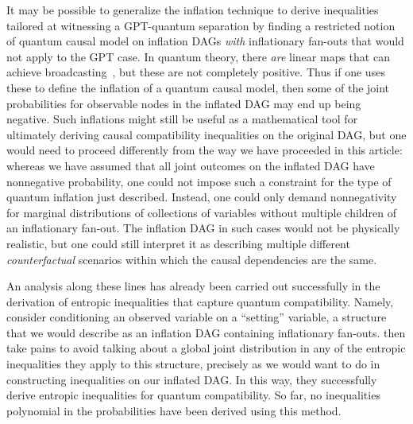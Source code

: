 {It may be possible to generalize the inflation technique to derive inequalities tailored at witnessing a GPT-quantum separation by finding a restricted notion of quantum causal model on inflation DAGs \emph{with} inflationary fan-outs that would not apply to the GPT case.
In quantum theory, there {\em are} linear maps that can achieve broadcasting~\cite{Coecke2011}, but these are not completely positive. Thus if one uses these to define the inflation of a quantum causal model, then some of the joint probabilities for observable nodes in the inflated DAG may end up being negative.  Such inflations might still be useful as a mathematical tool for ultimately deriving causal compatibility inequalities on the original DAG, but one would need to proceed differently from the way we have proceeded in this article: whereas we have assumed that all joint outcomes on the inflated DAG have nonnegative probability, one could not impose such a constraint for the type of quantum inflation just described.  Instead, one could only demand nonnegativity for marginal distributions of collections of variables without multiple children of an inflationary fan-out.  The inflation DAG in such cases would not be physically realistic, but one could still interpret it as describing multiple different {\em counterfactual} scenarios within which the causal dependencies are the same.

An analysis along these lines has already been carried out successfully in the derivation of entropic inequalities that capture quantum compatibility. Namely, \citet{Chaves2015infoquantum} consider conditioning an observed variable on a ``setting'' variable, a structure that we would describe as an inflation DAG containing inflationary fan-outs. \citet{Chaves2015infoquantum} then take pains to avoid talking about a global joint distribution in any of the entropic inequalities they apply to this structure, %
precisely as we would want to do in constructing inequalities on our inflated DAG. In this way, they successfully derive entropic inequalities for quantum compatibility. So far, no inequalities polynomial in the probabilities have been derived using this method.


}
